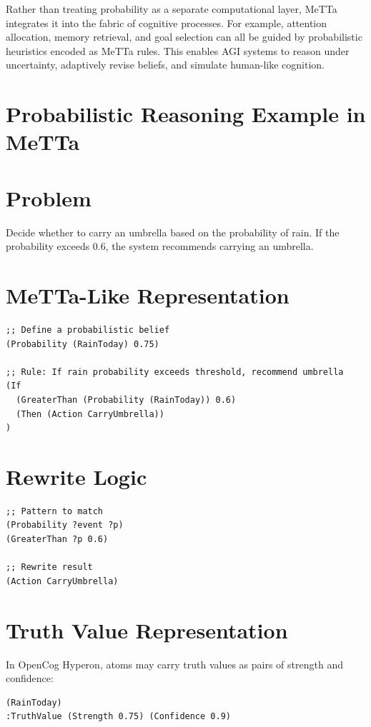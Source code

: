 \documentclass{article}
\begin{document}
Rather than treating probability as a separate computational layer, MeTTa integrates it into the fabric of cognitive processes. For example, attention allocation, memory retrieval, and goal selection can all be guided by probabilistic heuristics encoded as MeTTa rules. This enables AGI systems to reason under uncertainty, adaptively revise beliefs, and simulate human-like cognition.

\section{Probabilistic Reasoning Example in MeTTa}
\section{Problem}
Decide whether to carry an umbrella based on the probability of rain. If the probability exceeds 0.6, the system recommends carrying an umbrella.

\section{MeTTa-Like Representation}

\begin{verbatim}
;; Define a probabilistic belief
(Probability (RainToday) 0.75)

;; Rule: If rain probability exceeds threshold, recommend umbrella
(If
  (GreaterThan (Probability (RainToday)) 0.6)
  (Then (Action CarryUmbrella))
)
\end{verbatim}

\section{Rewrite Logic}

\begin{verbatim}
;; Pattern to match
(Probability ?event ?p)
(GreaterThan ?p 0.6)

;; Rewrite result
(Action CarryUmbrella)
\end{verbatim}

\section{Truth Value Representation}

In OpenCog Hyperon, atoms may carry truth values as pairs of strength and confidence:

\begin{verbatim}
(RainToday)
:TruthValue (Strength 0.75) (Confidence 0.9)
\end{verbatim}
\end{document}
